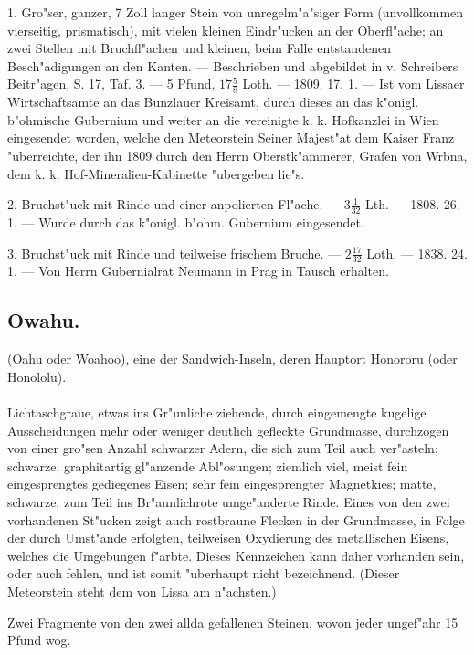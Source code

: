 \documentclass[a4paper, 11pt, oneside, polutonikogreek, german]{article}
\begin{document}
1. Gro"ser, ganzer, 7 Zoll langer Stein von unregelm"a"siger Form (unvollkommen vierseitig, prismatisch), mit vielen kleinen Eindr"ucken an der Oberfl"ache; an zwei Stellen mit Bruchfl"achen und kleinen, beim Falle entstandenen Besch"adigungen an den Kanten. --- Beschrieben und abgebildet in v. Schreibers Beitr"agen, S. 17, Taf. 3. --- 5 Pfund, $17\frac{5}{8}$ Loth. --- 1809. 17. 1. --- Ist vom Lissaer Wirtschaftsamte an das Bunzlauer Kreisamt, durch dieses an das k"onigl. b"ohmische Gubernium und weiter an die vereinigte k. k. Hofkanzlei in Wien eingesendet worden, welche den Meteorstein Seiner Majest"at dem Kaiser Franz "uberreichte, der ihn 1809 durch den Herrn Oberstk"ammerer, Grafen von Wrbna, dem k. k. Hof-Mineralien-Kabinette "ubergeben lie"s.

2. Bruchst"uck mit Rinde und einer anpolierten Fl"ache. --- $3\frac{1}{32}$ Lth. --- 1808. 26. 1. --- Wurde durch das k"onigl. b"ohm. Gubernium eingesendet.

3. Bruchst"uck mit Rinde und teilweise frischem Bruche. --- $2\frac{17}{32}$ Loth. --- 1838. 24. 1. --- Von Herrn Gubernialrat Neumann in Prag in Tausch erhalten.
\subsection{Owahu.}
\begin{center}
\small
(Oahu oder Woahoo), eine der Sandwich-Inseln, deren Hauptort Honororu (oder Honololu).
\end{center}
\paragraph{}
Lichtaschgraue, etwas ins Gr"unliche ziehende, durch eingemengte kugelige Ausscheidungen mehr oder weniger deutlich gefleckte Grundmasse, durchzogen von einer gro"sen Anzahl schwarzer Adern, die sich zum Teil auch ver"asteln; schwarze, graphitartig gl"anzende Abl"osungen; ziemlich viel, meist fein eingesprengtes gediegenes Eisen; sehr fein eingesprengter Magnetkies; matte, schwarze, zum Teil ins Br"aunlichrote umge"anderte Rinde. Eines von den zwei vorhandenen St"ucken zeigt auch rostbraune Flecken in der Grundmasse, in Folge der durch Umst"ande erfolgten, teilweisen Oxydierung des metallischen Eisens, welches die Umgebungen f"arbte. Dieses Kennzeichen kann daher vorhanden sein, oder auch fehlen, und ist somit "uberhaupt nicht bezeichnend. (Dieser Meteorstein steht dem von Lissa am n"achsten.)

Zwei Fragmente von den zwei allda gefallenen Steinen, wovon jeder ungef"ahr 15 Pfund wog.
\end{document}
